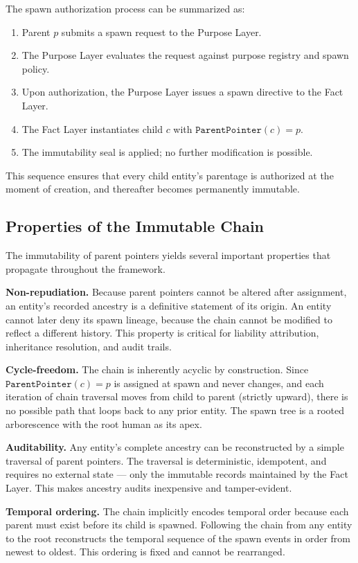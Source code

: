 The spawn authorization process can be summarized as:
\begin{enumerate}
    \item Parent $p$ submits a spawn request to the Purpose Layer.
    \item The Purpose Layer evaluates the request against purpose registry and spawn policy.
    \item Upon authorization, the Purpose Layer issues a spawn directive to the Fact Layer.
    \item The Fact Layer instantiates child $c$ with $\texttt{ParentPointer}(c) = p$.
    \item The immutability seal is applied; no further modification is possible.
\end{enumerate}

This sequence ensures that every child entity's parentage is authorized at the moment of creation, and thereafter becomes permanently immutable.

\subsection{Properties of the Immutable Chain}

The immutability of parent pointers yields several important properties that propagate throughout the framework.

\textbf{Non-repudiation.} Because parent pointers cannot be altered after assignment, an entity's recorded ancestry is a definitive statement of its origin. An entity cannot later deny its spawn lineage, because the chain cannot be modified to reflect a different history. This property is critical for liability attribution, inheritance resolution, and audit trails.

\textbf{Cycle-freedom.} The chain is inherently acyclic by construction. Since $\texttt{ParentPointer}(c) = p$ is assigned at spawn and never changes, and each iteration of chain traversal moves from child to parent (strictly upward), there is no possible path that loops back to any prior entity. The spawn tree is a rooted arborescence with the root human as its apex.

\textbf{Auditability.} Any entity's complete ancestry can be reconstructed by a simple traversal of parent pointers. The traversal is deterministic, idempotent, and requires no external state — only the immutable records maintained by the Fact Layer. This makes ancestry audits inexpensive and tamper-evident.

\textbf{Temporal ordering.} The chain implicitly encodes temporal order because each parent must exist before its child is spawned. Following the chain from any entity to the root reconstructs the temporal sequence of the spawn events in order from newest to oldest. This ordering is fixed and cannot be rearranged.

